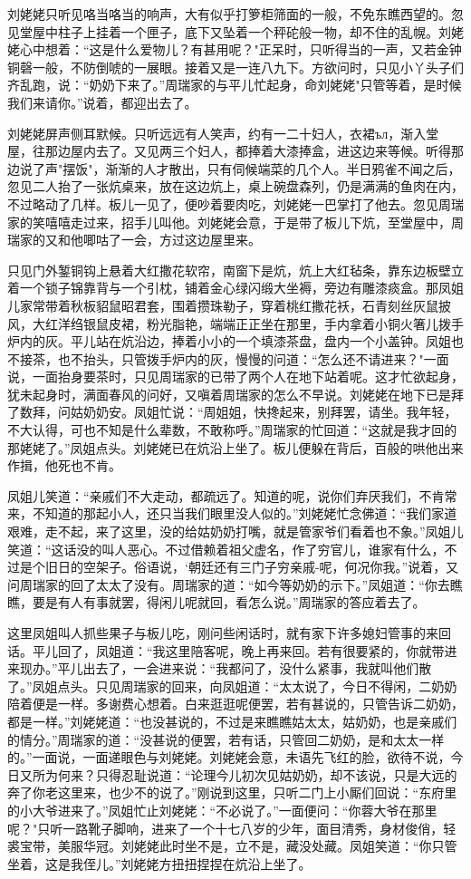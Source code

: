 刘姥姥只听见咯当咯当的响声，大有似乎打箩柜筛面的一般，不免东瞧西望的。忽见堂屋中柱子上挂着一个匣子，底下又坠着一个秤砣般一物，却不住的乱幌。刘姥姥心中想着：“这是什么爱物儿？有甚用呢？"正呆时，只听得当的一声，又若金钟铜磬一般，不防倒唬的一展眼。接着又是一连八九下。方欲问时，只见小丫头子们齐乱跑，说：“奶奶下来了。”周瑞家的与平儿忙起身，命刘姥姥"只管等着，是时候我们来请你。”说着，都迎出去了。

刘姥姥屏声侧耳默候。只听远远有人笑声，约有一二十妇人，衣裙ъл，渐入堂屋，往那边屋内去了。又见两三个妇人，都捧着大漆捧盒，进这边来等候。听得那边说了声"摆饭"，渐渐的人才散出，只有伺候端菜的几个人。半日鸦雀不闻之后，忽见二人抬了一张炕桌来，放在这边炕上，桌上碗盘森列，仍是满满的鱼肉在内，不过略动了几样。板儿一见了，便吵着要肉吃，刘姥姥一巴掌打了他去。忽见周瑞家的笑嘻嘻走过来，招手儿叫他。刘姥姥会意，于是带了板儿下炕，至堂屋中，周瑞家的又和他唧咕了一会，方过这边屋里来。

只见门外錾铜钩上悬着大红撒花软帘，南窗下是炕，炕上大红毡条，靠东边板壁立着一个锁子锦靠背与一个引枕，铺着金心绿闪缎大坐褥，旁边有雕漆痰盒。那凤姐儿家常带着秋板貂鼠昭君套，围着攒珠勒子，穿着桃红撒花袄，石青刻丝灰鼠披风，大红洋绉银鼠皮裙，粉光脂艳，端端正正坐在那里，手内拿着小铜火箸儿拨手炉内的灰。平儿站在炕沿边，捧着小小的一个填漆茶盘，盘内一个小盖钟。凤姐也不接茶，也不抬头，只管拨手炉内的灰，慢慢的问道：“怎么还不请进来？"一面说，一面抬身要茶时，只见周瑞家的已带了两个人在地下站着呢。这才忙欲起身，犹未起身时，满面春风的问好，又嗔着周瑞家的怎么不早说。刘姥姥在地下已是拜了数拜，问姑奶奶安。凤姐忙说：“周姐姐，快搀起来，别拜罢，请坐。我年轻，不大认得，可也不知是什么辈数，不敢称呼。”周瑞家的忙回道：“这就是我才回的那姥姥了。”凤姐点头。刘姥姥已在炕沿上坐了。板儿便躲在背后，百般的哄他出来作揖，他死也不肯。

凤姐儿笑道：“亲戚们不大走动，都疏远了。知道的呢，说你们弃厌我们，不肯常来，不知道的那起小人，还只当我们眼里没人似的。”刘姥姥忙念佛道：“我们家道艰难，走不起，来了这里，没的给姑奶奶打嘴，就是管家爷们看着也不象。”凤姐儿笑道：“这话没的叫人恶心。不过借赖着祖父虚名，作了穷官儿，谁家有什么，不过是个旧日的空架子。俗语说，`朝廷还有三门子穷亲戚-呢，何况你我。”说着，又问周瑞家的回了太太了没有。周瑞家的道：“如今等奶奶的示下。”凤姐道：“你去瞧瞧，要是有人有事就罢，得闲儿呢就回，看怎么说。”周瑞家的答应着去了。

这里凤姐叫人抓些果子与板儿吃，刚问些闲话时，就有家下许多媳妇管事的来回话。平儿回了，凤姐道：“我这里陪客呢，晚上再来回。若有很要紧的，你就带进来现办。”平儿出去了，一会进来说：“我都问了，没什么紧事，我就叫他们散了。”凤姐点头。只见周瑞家的回来，向凤姐道：“太太说了，今日不得闲，二奶奶陪着便是一样。多谢费心想着。白来逛逛呢便罢，若有甚说的，只管告诉二奶奶，都是一样。”刘姥姥道：“也没甚说的，不过是来瞧瞧姑太太，姑奶奶，也是亲戚们的情分。”周瑞家的道：“没甚说的便罢，若有话，只管回二奶奶，是和太太一样的。”一面说，一面递眼色与刘姥姥。刘姥姥会意，未语先飞红的脸，欲待不说，今日又所为何来？只得忍耻说道：“论理今儿初次见姑奶奶，却不该说，只是大远的奔了你老这里来，也少不的说了。”刚说到这里，只听二门上小厮们回说：“东府里的小大爷进来了。”凤姐忙止刘姥姥：“不必说了。”一面便问：“你蓉大爷在那里呢？"只听一路靴子脚响，进来了一个十七八岁的少年，面目清秀，身材俊俏，轻裘宝带，美服华冠。刘姥姥此时坐不是，立不是，藏没处藏。凤姐笑道：“你只管坐着，这是我侄儿。”刘姥姥方扭扭捏捏在炕沿上坐了。

